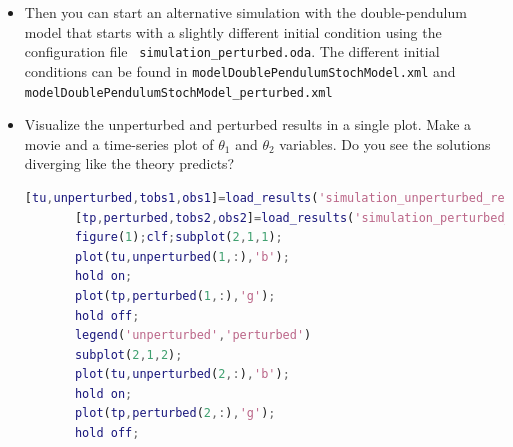 \begin{itemize}
\ifshowmatlab
      To create a time-series plot in Matlab type:
      \begin{lstlisting}[language=Matlab,frame=single,caption={Matlab}]
       subplot(2,1,1);
       plot(t,unperturbed(1,:),'b-');
       ylabel('\theta_1');
       subplot(2,1,2);
       plot(t,unperturbed(2,:),'b-');
       ylabel('\theta_2');
       xlabel('time');
      \end{lstlisting}
\fi
      
      To create a time-series plot in Python type:
      \begin{lstlisting}[language=Python,frame=single,caption={Python}]
      plt.subplot(2,1,1)
      plt.plot(unperturbed.model_time,unperturbed.x[:,0],'b') #python counts starting at 0
      plt.ylabel(r'$\theta_1$') # use raw string and latex for label
      plt.subplot(2,1,2)
      plt.plot(unperturbed.model_time,unperturbed.x[:,1],'b')
      plt.ylabel(r'$\theta_2$')
      plt.show() #only needed if interactive plotting is off. Set with plt.ioff(), plt.ion()
      \end{lstlisting}
%


\item Then you can start an alternative simulation with the double-pendulum model that
       starts with a slightly different initial condition using the
       configuration file \texttt{ simulation\_perturbed.oda}. The different initial conditions
       can be found in \texttt{model\/DoublePendulumStochModel.xml} and \\
       \texttt{model\/DoublePendulumStochModel\_perturbed.xml}

\item  Visualize the unperturbed and perturbed results in a single plot. Make
       a movie and a time-series plot of $\theta_1$ and $\theta_2$ variables. Do you see
       the solutions diverging like the theory predicts?
       
\ifshowmatlab
      \begin{lstlisting}[language=Matlab,frame=single,caption={Matlab}]
       [tu,unperturbed,tobs1,obs1]=load_results('simulation_unperturbed_results');
       [tp,perturbed,tobs2,obs2]=load_results('simulation_perturbed_results');
       figure(1);clf;subplot(2,1,1);
       plot(tu,unperturbed(1,:),'b');
       hold on;
       plot(tp,perturbed(1,:),'g');
       hold off;
       legend('unperturbed','perturbed')
       subplot(2,1,2);
       plot(tu,unperturbed(2,:),'b');
       hold on;
       plot(tp,perturbed(2,:),'g');
       hold off;
      \end{lstlisting}
\fi
      

\end{itemize}
